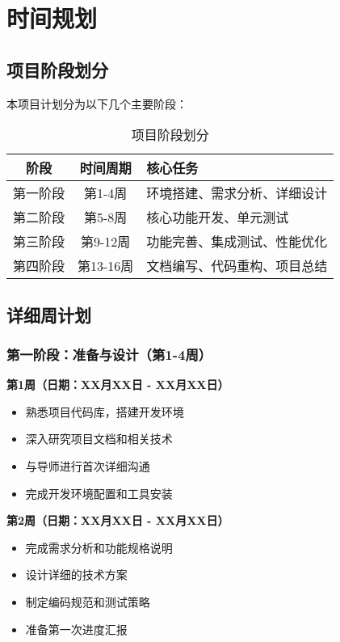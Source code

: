 \documentclass[a4paper,12pt]{article}
\begin{document}
\section{时间规划}

\subsection{项目阶段划分}

本项目计划分为以下几个主要阶段：

\begin{table}[H]
\centering
\begin{tabular}{|c|c|p{8cm}|}
\hline
\textbf{阶段} & \textbf{时间周期} & \textbf{核心任务} \\
\hline
第一阶段 & 第1-4周 & 环境搭建、需求分析、详细设计 \\
\hline
第二阶段 & 第5-8周 & 核心功能开发、单元测试 \\
\hline
第三阶段 & 第9-12周 & 功能完善、集成测试、性能优化 \\
\hline
第四阶段 & 第13-16周 & 文档编写、代码重构、项目总结 \\
\hline
\end{tabular}
\caption{项目阶段划分}
\end{table}

\subsection{详细周计划}

\subsubsection{第一阶段：准备与设计（第1-4周）}

\textbf{第1周（日期：XX月XX日 - XX月XX日）}
\begin{itemize}
    \item 熟悉项目代码库，搭建开发环境
    \item 深入研究项目文档和相关技术
    \item 与导师进行首次详细沟通
    \item 完成开发环境配置和工具安装
\end{itemize}

\textbf{第2周（日期：XX月XX日 - XX月XX日）}
\begin{itemize}
    \item 完成需求分析和功能规格说明
    \item 设计详细的技术方案
    \item 制定编码规范和测试策略
    \item 准备第一次进度汇报
\end{itemize}
\end{document}
